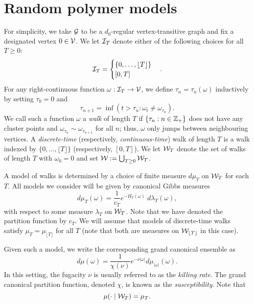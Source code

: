 
\section{Random polymer models}

For simplicity, we take $\mathcal{G}$ to be a $d_0$-regular vertex-transitive graph and fix a designated vertex $0 \in \mathcal{V}$. We let $\mathcal{I}_T$ denote either of the following choices for all $T \ge 0$:
\begin{equation}
\mathcal{I}_T
  =
\begin{cases}
\{ 0, \ldots, \lfloor T \rfloor \} \\
[0, T]
\end{cases}.
\end{equation}
For any right-continuous function $\omega : \mathcal{I}_T \rightarrow \mathcal{V}$, we define
$\tau_n = \tau_n(\omega)$ inductively by setting $\tau_0 = 0$ and
\begin{equation}
\tau_{n+1} = \inf(t > \tau_n : \omega_t \ne \omega_{\tau_n}).
\end{equation}
We call such a function $\omega$ a \emph{walk} of length $T$ if
$\{ \tau_n : n \in {\mathbb Z}_+ \}$ does not have any cluster points and
$\omega_{\tau_n} \sim \omega_{\tau_{n+1}}$ for all $n$; thus, $\omega$
only jumps between neighbouring vertices. A \emph{discrete-time} (respectively,
\emph{continuous-time}) walk of length $T$ is a walk indexed by
$\{ 0, \ldots, \lfloor T \rfloor \}$ (respectively, $[0, T]$).
We let $\mathcal{W}_T$ denote the set of walks of length $T$ with $\omega_0 = 0$ and set $\mathcal{W} := \bigcup_{T \geq 0} \mathcal{W}_T$.

A model of walks is determined by a choice of finite measure $d\mu_T$ on
$\mathcal{W}_T$ for each $T$. All models we consider will be given by canonical Gibbs measures
\begin{equation}
d\mu_T(\omega) = \frac{1}{c_T} e^{-H_T(\omega)} \; d\lambda_T(\omega),
\end{equation}
with respect to some measure $\lambda_T$ on $\mathcal{W}_T$. Note that we have denoted the partition function by $c_T$. We will assume that models of discrete-time walks satisfy $\mu_T = \mu_{\lfloor T \rfloor}$ for all $T$
(note that both are measures on $\mathcal{W}_{\lfloor T \rfloor}$ in this case).

Given such a model, we write the corresponding grand canonical ensemble as
\begin{equation}
d\mu(\omega) = \frac{1}{\chi(\nu)} e^{-\nu |\omega|} d\mu_{|\omega|}(\omega).
\end{equation}
In this setting, the fugacity $\nu$ is usually referred to as the \emph{killing rate}. The grand canonical partition function, denoted $\chi$, is known as the \emph{susceptibility}. Note that
\begin{equation}
\mu(\cdot \mid \mathcal{W}_T) = \mu_T.
\end{equation}

